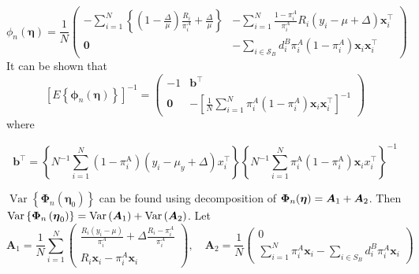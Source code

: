 \documentclass[
  letterpaper,
  DIV=11,
  numbers=noendperiod]{scrreprt}
\begin{document}
\[
\phi_n(\boldsymbol{\eta})=\frac{1}{N}\left(\begin{array}{cc}
-\sum_{i=1}^N\left\{\left(1-\frac{\Delta}{\mu}\right) \frac{R_i}{\pi_i^A}+\frac{\Delta}{\mu}\right\} & -\sum_{i=1}^N \frac{1-\pi_i^A}{\pi_i^A} R_i\left(y_i-\mu+\Delta\right) \boldsymbol{x}_i^{\top} \\
\mathbf{0} & -\sum_{i \in \mathcal{S}_B} d_i^B \pi_i^A\left(1-\pi_i^A\right) \boldsymbol{x}_i \boldsymbol{x}_i^{\top}
\end{array}\right)
\] It can be shown that \[
\left[E\left\{\boldsymbol{\phi}_n(\boldsymbol{\eta})\right\}\right]^{-1}=\left(\begin{array}{cc}
-1 &  \mathbf{b}^{\top} \\
\mathbf{0} & -\left[\frac{1}{N} \sum_{i=1}^N \pi_i^A\left(1-\pi_i^A\right) \boldsymbol{x}_i \boldsymbol{x}_i^{\top}\right]^{-1}
\end{array}\right)
\] where

\[
\mathbf{b}^{\top} = 
\left\{N^{-1} \sum_{i=1}^N\left(1-\pi_i^{\mathrm{A}}\right) \left(y_i-\mu_y + \Delta\right) x_i^{\top}\right\}\left\{N^{-1} \sum_{i=1}^N \pi_i^{\mathrm{A}}\left(1-\pi_i^{\mathrm{A}}\right) \boldsymbol{x}_i x_i^{\top}\right\}^{-1}
\]

\(\operatorname{Var}\left\{\boldsymbol{\Phi}_n\left(\boldsymbol{\eta}_0\right)\right\}\)
can be found using decomposition of
\(\boldsymbol{\Phi}_n(\boldsymbol{\eta}) = \boldsymbol{A}_1 + \boldsymbol{A}_2\). Then
\(\operatorname{Var}\left\{\boldsymbol{\Phi}_n\left(\boldsymbol{\eta}_0\right)\right\} = \operatorname{Var}\left(\boldsymbol{A}_1\right) + \operatorname{Var}\left(\boldsymbol{A}_2\right)\).
Let \[
\mathbf{A}_1=\frac{1}{N} \sum_{i=1}^N\left(\begin{array}{c}
\frac{R_i\left(y_i-\mu\right)}{\pi_i^A}+\Delta \frac{R_i-\pi_i^A}{\pi_i^A} \\
R_i \boldsymbol{x}_i-\pi_i^A \boldsymbol{x}_i
\end{array}\right), \quad \mathbf{A}_2=\frac{1}{N}\left(\begin{array}{c}
0 \\
\sum_{i=1}^N \pi_i^A \boldsymbol{x}_i-\sum_{i \in S_B} d_i^B \pi_i^A \boldsymbol{x}_i
\end{array}\right)
\]
\end{document}
